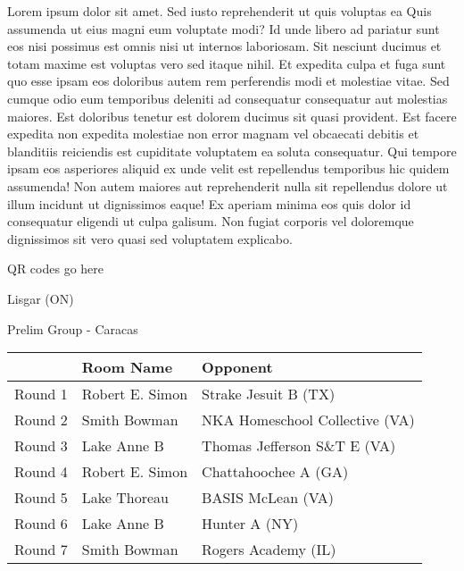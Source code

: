 \documentclass{article}%
\begin{document}
\vspace*{8pt}%
\linebreak%
\newline%
\newline%
Lorem ipsum dolor sit amet. Sed iusto reprehenderit ut quis voluptas ea Quis assumenda ut eius magni eum voluptate modi? Id unde libero ad pariatur sunt eos nisi possimus est omnis nisi ut internos laboriosam. Sit nesciunt ducimus et totam maxime est voluptas vero sed itaque nihil. Et expedita culpa et fuga sunt quo esse ipsam eos doloribus autem rem perferendis modi et molestiae vitae.\newline%
\newline%
Sed cumque odio eum temporibus deleniti ad consequatur consequatur aut molestias maiores. Est doloribus tenetur est dolorem ducimus sit quasi provident. Est facere expedita non expedita molestiae non error magnam vel obcaecati debitis et blanditiis reiciendis est cupiditate voluptatem ea soluta consequatur. Qui tempore ipsam eos asperiores aliquid ex unde velit est repellendus temporibus hic quidem assumenda!\newline%
\newline%
Non autem maiores aut reprehenderit nulla sit repellendus dolore ut illum incidunt ut dignissimos eaque! Ex aperiam minima eos quis dolor id consequatur eligendi ut culpa galisum. Non fugiat corporis vel doloremque dignissimos sit vero quasi sed voluptatem explicabo.\newline%
\newline%
%
\vspace*{30pt}%
\begin{center}%
\begin{Huge}%
QR codes go here%
\end{Huge}%
\end{center}%
\newpage%
%
\begin{center}%
\begin{Huge}%
Lisgar (ON)%
\end{Huge}%
\vspace*{8pt}%
\linebreak%
\begin{Large}%
Prelim Group {-} Caracas%
\end{Large}%
\end{center}%
\begin{tabularx}{\textwidth}{|c|Y|Y|}%
\hline%
&Room Name&Opponent\\%
\hline%
Round 1&Robert E. Simon&Strake Jesuit B (TX)\\%
Round 2&Smith Bowman&NKA Homeschool Collective (VA)\\%
Round 3&Lake Anne B&Thomas Jefferson S\&T E (VA)\\%
Round 4&Robert E. Simon&Chattahoochee A (GA)\\%
Round 5&Lake Thoreau&BASIS McLean (VA)\\%
Round 6&Lake Anne B&Hunter A (NY)\\%
Round 7&Smith Bowman&Rogers Academy (IL)\\%
\hline%
\end{tabularx}%
\end{document}
